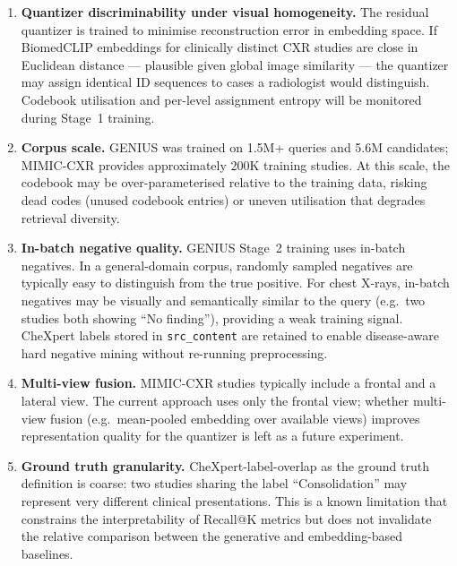 \documentclass[11pt,a4paper]{article}
\begin{document}
\begin{enumerate}[itemsep=4pt]

    \item \textbf{Quantizer discriminability under visual homogeneity.}
    The residual quantizer is trained to minimise reconstruction error in
    embedding space.
    If BiomedCLIP embeddings for clinically distinct CXR studies are close in
    Euclidean distance --- plausible given global image similarity ---
    the quantizer may assign identical ID sequences to cases a radiologist
    would distinguish.
    Codebook utilisation and per-level assignment entropy will be monitored
    during Stage~1 training.

    \item \textbf{Corpus scale.}
    GENIUS was trained on 1.5M+ queries and 5.6M candidates; MIMIC-CXR provides
    approximately 200K training studies.
    At this scale, the codebook may be over-parameterised relative to the
    training data, risking dead codes (unused codebook entries) or uneven
    utilisation that degrades retrieval diversity.

    \item \textbf{In-batch negative quality.}
    GENIUS Stage~2 training uses in-batch negatives.
    In a general-domain corpus, randomly sampled negatives are typically
    easy to distinguish from the true positive.
    For chest X-rays, in-batch negatives may be visually and semantically similar
    to the query (e.g.\ two studies both showing ``No finding''), providing
    a weak training signal.
    CheXpert labels stored in \texttt{src\_content} are retained to enable
    disease-aware hard negative mining without re-running preprocessing.

    \item \textbf{Multi-view fusion.}
    MIMIC-CXR studies typically include a frontal and a lateral view.
    The current approach uses only the frontal view; whether multi-view
    fusion (e.g.\ mean-pooled embedding over available views) improves
    representation quality for the quantizer is left as a future experiment.

    \item \textbf{Ground truth granularity.}
    CheXpert-label-overlap as the ground truth definition is coarse:
    two studies sharing the label ``Consolidation'' may represent very
    different clinical presentations.
    This is a known limitation that constrains the interpretability of
    Recall@K metrics but does not invalidate the relative comparison
    between the generative and embedding-based baselines.

\end{enumerate}
\end{document}
